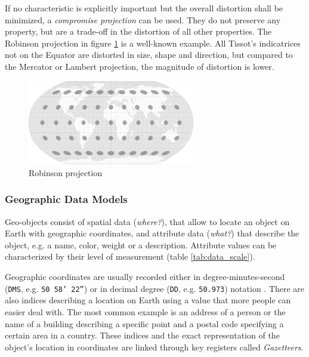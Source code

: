 If no characteristic is explicitly important but the overall distortion shall be minimized, a \emph{compromise projection} can be used. They do not preserve any property, but are a trade-off in the distortion of all other properties. The Robinson projection in figure \ref{fig:robinson_projection} is a well-known example. All Tissot's indicatrices not on the Equator are distorted in size, shape and direction, but compared to the Mercator or Lambert projection, the magnitude of distortion is lower.

\begin{figure}[ht]
  \centering
  \includegraphics[width=0.65\textwidth]{graphics/basics/projection_distortion_robinson.png}
  \caption{Robinson projection \protect\footnotemark}
  \label{fig:robinson_projection}
\end{figure}




\subsubsection{Geographic Data Models} %
\label{ssub:data_models}

Geo-objects consist of spatial data (\emph{where?}), that allow to locate an object on Earth with geographic coordinates, and attribute data (\emph{what?}) that describe the object, e.g. a name, color, weight or a description. Attribute values can be characterized by their level of measurement (table \ref{tab:data_scale}).

Geographic coordinates are usually recorded either in degree-minutes-second (\texttt{DMS}, e.g. \texttt{50\degree~58' 22''}) or in decimal degree (\texttt{DD}, e.g. \texttt{50.973}) notation
\cite[pp. 30, 79]{bolstad2008gis}.
There are also indices describing a location on Earth using a value that more people can easier deal with. The most common example is an address of a person or the name of a building describing a specific point and a postal code specifying a certain area in a country. These indices and the exact representation of the object's location in coordinates are linked through key registers called \emph{Gazetteers}.


